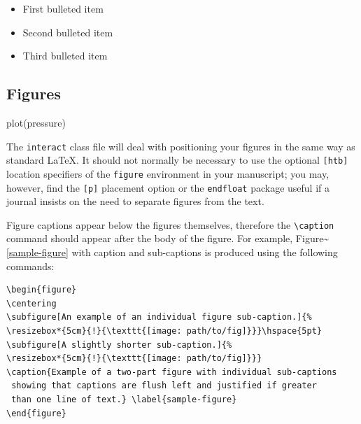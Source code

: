 \documentclass[]{interact}
\theoremstyle{plain}%
\theoremstyle{definition}
\theoremstyle{remark}
\newenvironment{Shaded}{\begin{snugshade}}{\end{snugshade}}
\newcommand{\FunctionTok}[1]{\textcolor[rgb]{0.00,0.00,0.00}{#1}}
\newcommand{\NormalTok}[1]{#1}
\providecommand{\tightlist}{%
  \setlength{\itemsep}{0pt}\setlength{\parskip}{0pt}}
\def\tightlist{}
\begin{document}
\begin{itemize}
\tightlist
\item
  First bulleted item
\item
  Second bulleted item
\item
  Third bulleted item
\end{itemize}

\hypertarget{figures}{%
\subsection{Figures}\label{figures}}

\begin{Shaded}
\begin{Highlighting}[]
\FunctionTok{plot}\NormalTok{(pressure)}
\end{Highlighting}
\end{Shaded}

The \texttt{interact} class file will deal with positioning your figures
in the same way as standard \LaTeX. It should not normally be necessary
to use the optional \texttt{{[}htb{]}} location specifiers of the
\texttt{figure} environment in your manuscript; you may, however, find
the \texttt{{[}p{]}} placement option or the \texttt{endfloat} package
useful if a journal insists on the need to separate figures from the
text.

Figure captions appear below the figures themselves, therefore the
\texttt{\textbackslash{}caption} command should appear after the body of
the figure. For example, Figure\textasciitilde{}\ref{sample-figure} with
caption and sub-captions is produced using the following commands:

\begin{verbatim}
\begin{figure}
\centering
\subfigure[An example of an individual figure sub-caption.]{%
\resizebox*{5cm}{!}{\texttt{[image: path/to/fig]}}}\hspace{5pt}
\subfigure[A slightly shorter sub-caption.]{%
\resizebox*{5cm}{!}{\texttt{[image: path/to/fig]}}}
\caption{Example of a two-part figure with individual sub-captions
 showing that captions are flush left and justified if greater
 than one line of text.} \label{sample-figure}
\end{figure}
\end{verbatim}
\end{document}
